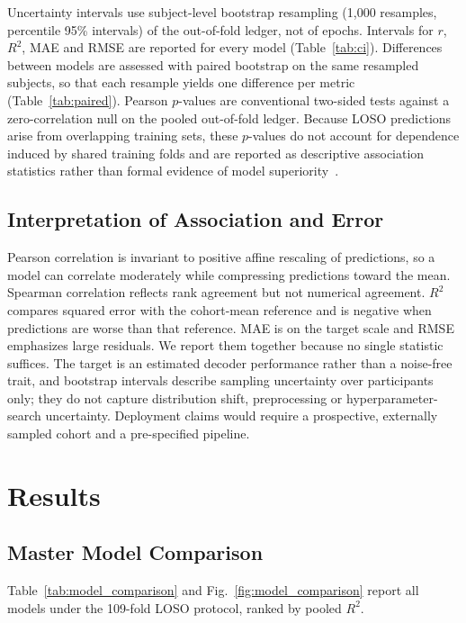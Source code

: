 \documentclass{ieeeaccess}
\begin{document}
Uncertainty intervals use subject-level bootstrap resampling (1,000 resamples, percentile 95\% intervals) of the out-of-fold ledger, not of epochs. Intervals for $r$, $R^2$, MAE and RMSE are reported for every model (Table~\ref{tab:ci}). Differences between models are assessed with paired bootstrap on the same resampled subjects, so that each resample yields one difference per metric (Table~\ref{tab:paired}). Pearson $p$-values are conventional two-sided tests against a zero-correlation null on the pooled out-of-fold ledger. Because LOSO predictions arise from overlapping training sets, these $p$-values do not account for dependence induced by shared training folds and are reported as descriptive association statistics rather than formal evidence of model superiority~\cite{varoquaux2017}.
\subsection{Interpretation of Association and Error}

Pearson correlation is invariant to positive affine rescaling of predictions, so a model can correlate moderately while compressing predictions toward the mean. Spearman correlation reflects rank agreement but not numerical agreement. $R^2$ compares squared error with the cohort-mean reference and is negative when predictions are worse than that reference. MAE is on the target scale and RMSE emphasizes large residuals. We report them together because no single statistic suffices. The target is an estimated decoder performance rather than a noise-free trait, and bootstrap intervals describe sampling uncertainty over participants only; they do not capture distribution shift, preprocessing or hyperparameter-search uncertainty. Deployment claims would require a prospective, externally sampled cohort and a pre-specified pipeline.

\section{Results}

\subsection{Master Model Comparison}

Table~\ref{tab:model_comparison} and Fig.~\ref{fig:model_comparison} report all models under the 109-fold LOSO protocol, ranked by pooled $R^2$.
\end{document}
